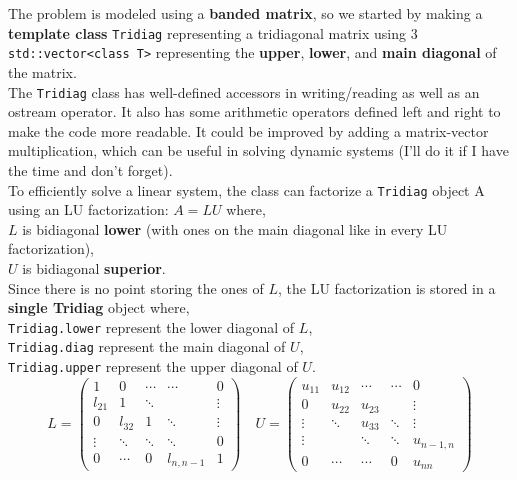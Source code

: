 \documentclass{article}
\begin{document}
The problem is modeled using a \textbf{banded matrix}, so we started by making a \textbf{template class} \texttt{Tridiag} representing a tridiagonal matrix using 3 \texttt{std::vector<class T>} representing the \textbf{upper}, \textbf{lower}, and \textbf{main diagonal} of the matrix. \\ 

The \texttt{Tridiag} class has well-defined accessors in writing/reading as well as an ostream operator. It also has some arithmetic operators defined left and right to make the code more readable. It could be improved by adding a matrix-vector multiplication, which can be useful in solving dynamic systems (I'll do it if I have the time and don't forget). \\

To efficiently solve a linear system, the class can factorize a \texttt{Tridiag} object A using an LU factorization: $A=LU$ where,\\ $L$ is bidiagonal \textbf{lower} (with ones on the main diagonal like in every LU factorization), \\
$U$ is bidiagonal \textbf{superior}.  \\ 

Since there is no point storing the ones of $L$, the LU factorization is stored in a \textbf{single Tridiag} object where, \\ 
\texttt{Tridiag.lower} represent the lower diagonal of $L$,  \\
\texttt{Tridiag.diag} represent the main diagonal of $U$,  \\
\texttt{Tridiag.upper} represent the upper diagonal of $U$.  \\

\[
L =
\begin{pmatrix}
    1 & 0&\cdots & \cdots & 0 \\
    l_{21} & 1 & \ddots& & \vdots \\
    0 & l_{32} & 1 &\ddots & \vdots \\
    \vdots &\ddots & \ddots & \ddots & 0\\
    0 & \cdots & 0 & l_{n,n-1} & 1
\end{pmatrix}
\quad
U =
\begin{pmatrix}
    u_{11} & u_{12} & \cdots & \cdots & 0 \\
    0 & u_{22} & u_{23} &  & \vdots\\
    \vdots & \ddots & u_{33} & \ddots & \vdots\\
    \vdots &  &  \ddots & \ddots & u_{n-1, n}\\
    0& \cdots& \cdots&0 & u_{nn}
\end{pmatrix}
\]
\end{document}

